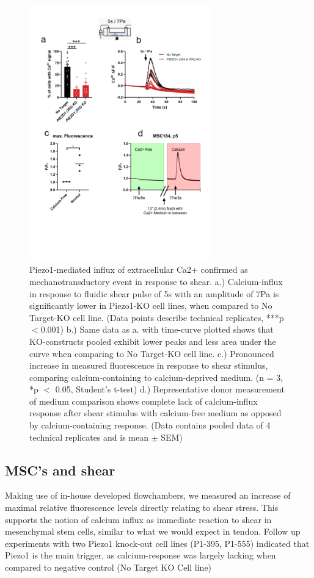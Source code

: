 \begin{figure}
    \centering
    \includegraphics[width = 0.7\textwidth]{Combined_CalciumFree_KnockOut.png}
    \caption{Piezo1-mediated influx of extracellular Ca2+ confirmed as mechanotransductory event in response to shear. a.) Calcium-influx in response to fluidic shear pulse of 5s with an amplitude of 7Pa is significantly lower in Piezo1-KO cell lines, when compared to No Target-KO cell line. (Data points describe technical replicates, ***p$<$0.001) b.) Same data as a. with time-curve plotted shows that KO-constructs pooled exhibit lower peaks and less area under the curve when comparing to No Target-KO cell line. c.) Pronounced increase in measured fluorescence in response to shear stimulus, comparing calcium-containing to calcium-deprived medium. (n = 3, *p $<$ 0.05, Student's t-test) d.) Representative donor measurement of medium comparison shows complete lack of calcium-influx response after shear stimulus with calcium-free medium as opposed by calcium-containing response. (Data contains pooled data of 4 technical replicates and is mean $\pm$ SEM)}
    \label{fig:Calcium}
\end{figure}

\subsection{MSC's and shear}
Making use of in-house developed flowchambers, we measured an increase of maximal relative fluorescence levels directly relating to shear stress. This supports the notion of calcium influx as immediate reaction to shear in mesenchymal stem cells, similar to what we would expect in tendon. Follow up experiments with two Piezo1 knock-out cell lines (P1-395, P1-555) indicated that Piezo1 is the main trigger, as calcium-response was largely lacking when compared to negative control (No Target KO Cell line)

